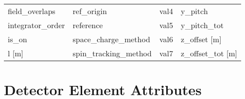 \begin{tabular}{llll}
field_overlaps                 & ref_origin                     & val4                           & y_pitch                        \\
integrator_order               & reference                      & val5                           & y_pitch_tot                    \\
is_on                          & space_charge_method            & val6                           & z_offset [m]                   \\
l [m]                          & spin_tracking_method           & val7                           & z_offset_tot [m]               \\
 \bottomrule
 \end{tabular}
 \vfill
 
 \section{Detector Element Attributes}
 \label{s:list.detector}
 
